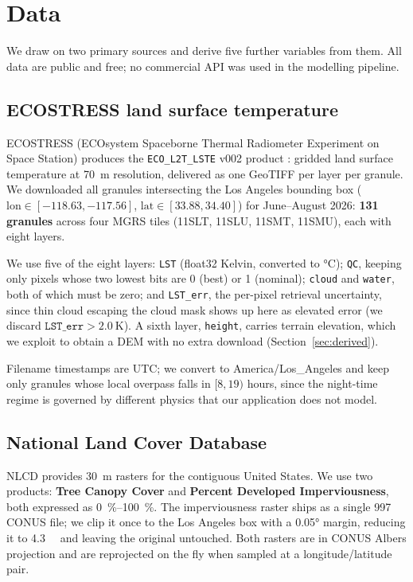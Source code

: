 \documentclass[10pt]{article}   %
\begin{document}
\section{Data}
\label{sec:data}

We draw on two primary sources and derive five further variables from them. All data are
public and free; no commercial API was used in the modelling pipeline.

\subsection{ECOSTRESS land surface temperature}
ECOSTRESS (ECOsystem Spaceborne Thermal Radiometer Experiment on Space Station)
\citep{fisher2020ecostress} produces the \texttt{ECO\_L2T\_LSTE} v002 product
\citep{hook2022lste}: gridded land surface temperature at \SI{70}{\metre} resolution,
delivered as one GeoTIFF per layer per granule. We downloaded all granules
intersecting the Los Angeles bounding box
($\text{lon} \in [-118.63, -117.56]$, $\text{lat} \in [33.88, 34.40]$) for June--August 2026:
\textbf{131 granules} across four MGRS tiles (11SLT, 11SLU, 11SMT, 11SMU), each with eight
layers.

We use five of the eight layers: \texttt{LST} (float32 Kelvin, converted to \si{\celsius});
\texttt{QC}, keeping only pixels whose two lowest bits are 0 (best) or 1 (nominal);
\texttt{cloud} and \texttt{water}, both of which must be zero; and \texttt{LST\_err}, the
per-pixel retrieval uncertainty, since thin cloud escaping the cloud mask shows up here as
elevated error (we discard $\texttt{LST\_err} > \SI{2.0}{\kelvin}$). A sixth layer,
\texttt{height}, carries terrain elevation, which we exploit to obtain a DEM with no extra
download (Section~\ref{sec:derived}).

Filename timestamps are UTC; we convert to America/Los\_Angeles and keep only granules whose
local overpass falls in $[8, 19)$ hours, since the night-time regime is governed by different
physics that our application does not model.

\subsection{National Land Cover Database}
NLCD \citep{dewitz2023nlcd} provides \SI{30}{\metre} rasters for the contiguous United
States. We use two products: \textbf{Tree Canopy Cover} and \textbf{Percent Developed
Imperviousness}, both expressed as \SIrange{0}{100}{\percent}. The imperviousness raster ships as a single \SI{997}{\mega\byte}
CONUS file; we clip it once to the Los Angeles box with a \ang{0.05} margin, reducing it to
\SI{4.3}{\mega\byte} and leaving the original untouched. Both rasters are in CONUS Albers
projection and are reprojected on the fly when sampled at a longitude/latitude pair.
\end{document}
